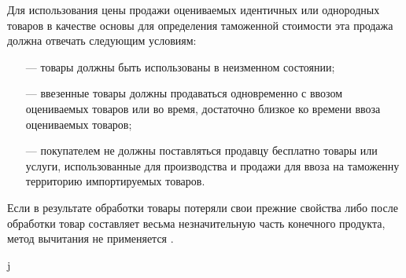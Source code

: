 Для использования цены продажи оцениваемых идентичных или однородных товаров в качестве основы для определения таможенной стоимости эта продажа должна отвечать следующим условиям:
\begin{enumerate}
	\item [---] товары должны быть использованы в неизменном состоянии;
	\item [---] ввезенные товары должны продаваться одновременно с ввозом оцениваемых товаров или во время, достаточно близкое ко времени ввоза оцениваемых товаров;
	\item [---] покупателем не должны поставляться продавцу бесплатно товары или услуги, использованные для производства и продажи для ввоза на таможенну территорию импортируемых товаров.
\end{enumerate}

Если в результате обработки товары потеряли свои прежние свойства либо после обработки товар составляет весьма незначительную часть конечного продукта, метод вычитания не применяется \cites[с. 271--275]{mahovikova}[с. 130--131]{novikova}.

j

























